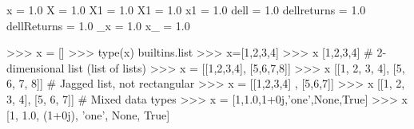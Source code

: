 

x = 1.0
X = 1.0
X1 = 1.0
X1 = 1.0
x1 = 1.0
dell = 1.0
dellreturns = 1.0
dellReturns = 1.0
_x = 1.0
x_ = 1.0



>>> x = []
>>> type(x)
builtins.list
>>> x=[1,2,3,4]
>>> x
[1,2,3,4]
# 2-dimensional list (list of lists)
>>> x = [[1,2,3,4], [5,6,7,8]]
>>> x
[[1, 2, 3, 4], [5, 6, 7, 8]]
# Jagged list, not rectangular
>>> x = [[1,2,3,4] , [5,6,7]]
>>> x
[[1, 2, 3, 4], [5, 6, 7]]
# Mixed data types
>>> x = [1,1.0,1+0j,’one’,None,True]
>>> x
[1, 1.0, (1+0j), ’one’, None, True]
